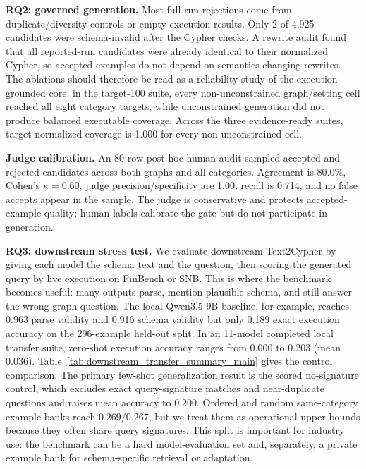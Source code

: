 \documentclass[11pt]{article}
\begin{document}


\noindent\textbf{RQ2: governed generation.} Most full-run rejections come from duplicate/diversity controls or empty execution results. Only 2 of 4,925 candidates were schema-invalid after the Cypher checks. A rewrite audit found that all reported-run candidates were already identical to their normalized Cypher, so accepted examples do not depend on semantics-changing rewrites. The ablations should therefore be read as a reliability study of the execution-grounded core: in the target-100 suite, every non-unconstrained graph/setting cell reached all eight category targets, while unconstrained generation did not produce balanced executable coverage. Across the three evidence-ready suites, target-normalized coverage is 1.000 for every non-unconstrained cell.

\noindent\textbf{Judge calibration.} An 80-row post-hoc human audit sampled accepted and rejected candidates across both graphs and all categories. Agreement is 80.0\%, Cohen's $\kappa=0.60$, judge precision/specificity are 1.00, recall is 0.714, and no false accepts appear in the sample. The judge is conservative and protects accepted-example quality; human labels calibrate the gate but do not participate in generation.

\noindent\textbf{RQ3: downstream stress test.} We evaluate downstream Text2Cypher by giving each model the schema text and the question, then scoring the generated query by live execution on FinBench or SNB. This is where the benchmark becomes useful: many outputs parse, mention plausible schema, and still answer the wrong graph question. The local Qwen3.5-9B baseline, for example, reaches 0.963 parse validity and 0.916 schema validity but only 0.189 exact execution accuracy on the 296-example held-out split. In an 11-model completed local transfer suite, zero-shot execution accuracy ranges from 0.000 to 0.203 (mean 0.036). Table~\ref{tab:downstream_transfer_summary_main} gives the control comparison. The primary few-shot generalization result is the scored no-signature control, which excludes exact query-signature matches and near-duplicate questions and raises mean accuracy to 0.200. Ordered and random same-category example banks reach 0.269/0.267, but we treat them as operational upper bounds because they often share query signatures. This split is important for industry use: the benchmark can be a hard model-evaluation set and, separately, a private example bank for schema-specific retrieval or adaptation.
\end{document}
